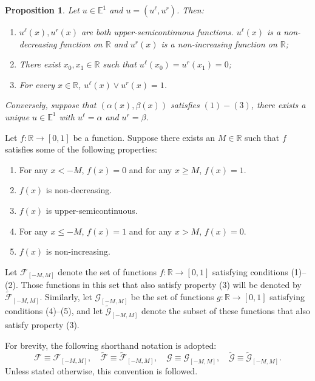 \documentclass[preprint,3p,times]{elsarticle}
\theoremstyle{plain}
\newtheorem{prop}[thm]{Proposition}
\theoremstyle{definition}
\numberwithin{equation}{section}
\begin{document}
\begin{prop}\label{fuzzy number u(x) re}
    Let \( u \in \mathbb{E}^1 \) and \( u = (u^\ell, u^r) \). Then:
\begin{enumerate}[label={\rm(\arabic*)}]
    \item \( u^\ell(x),  u^r(x)\)  are both upper-semicontinuous functions. \( u^\ell(x)\) is a non-decreasing function on \( \mathbb{R} \) and  \(u^r(x)\) is a non-increasing function on \( \mathbb{R} \);
    \item There exist \(x_0,x_1\in \mathbb{R}\) such that $u^\ell(x_0)=u^r(x_1)=0$;
    \item  For every \( x\in \mathbb{R} \), \( u^\ell(x)\vee u^r(x)=1\).
\end{enumerate}
Conversely, suppose that \( (\alpha(x), \beta(x)) \) satisfies \((1)-(3)\), there exists a unique \( u \in \mathbb{E}^1 \) with \( u^\ell = \alpha \) and \( u^r = \beta \).
\end{prop} 

Let \( f: \mathbb{R} \to [0,1] \) be a function. Suppose there exists an \(M\in \mathbb{R} \) such that \(f\) satisfies some of the following properties:
\begin{enumerate}[label={\rm(\arabic*)}]
	\item   For any \(x<-M\), \( f(x) = 0 \) and for any \(x\ge M\), \(f(x)=1\).
    \item \( f(x) \) is non-decreasing.
    \item \( f(x) \) is upper-semicontinuous.
    \item For any \(x\le -M\), \( f(x) = 1 \) and for any \(x>M\), \(f(x)=0\).
     \item \( f(x) \) is non-increasing.
\end{enumerate}

Let \(\mathcal{F}_{[-M,M]}\) denote the set of functions \(f: \mathbb{R} \to [0,1]\) satisfying conditions (1)--(2). Those functions in this set that also satisfy property (3) will be denoted by \(\tilde{\mathcal{F}}_{[-M,M]}\).  
Similarly, let \(\mathcal{G}_{[-M,M]}\) be the set of functions \(g: \mathbb{R} \to [0,1]\) satisfying conditions (4)--(5), and let \(\tilde{\mathcal{G}}_{[-M,M]}\) denote the subset of these functions that also satisfy property (3).

For brevity, the following shorthand notation is adopted:  
\[
\mathcal{F} \equiv \mathcal{F}_{[-M,M]}, \quad \tilde{\mathcal{F}} \equiv \tilde{\mathcal{F}}_{[-M,M]}, \quad \mathcal{G} \equiv \mathcal{G}_{[-M,M]}, \quad \tilde{\mathcal{G}} \equiv \tilde{\mathcal{G}}_{[-M,M]}.
\]  
Unless stated otherwise, this convention is followed.
\end{document}
